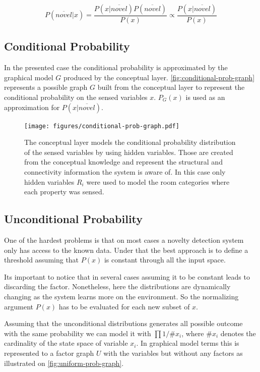 \documentclass[runningheads,a4paper]{llncs}
\begin{document}
\begin{equation}
\label{eq:novelty-threshold}
          P(\overline{novel}|x)
  =       \frac{P(x|\overline{novel}) P(\overline{novel})}{P(x)}
  \propto \frac{P(x|\overline{novel})}{P(x)}
\end{equation}

\subsection{Conditional Probability}
\label{sec:conditional-prob}


In the presented case the conditional probability is approximated by the graphical model $G$
produced by the conceptual layer.
\autoref{fig:conditional-prob-graph} represents a possible graph $G$ built from the conceptual
layer to represent the conditional probability on the sensed variables $x$.
$P_G(x)$ is used as an approximation for $P(x|\overline{novel})$.

\begin{figure}[h]
\centering
\texttt{[image: figures/conditional-prob-graph.pdf]}
\caption{\label{fig:conditional-prob-graph}The conceptual layer models the conditional
         probability distribution of the sensed variables by using hidden variables.
         Those are created from the conceptual knowledge and represent the structural
         and connectivity information the system is aware of.
         In this case only hidden variables $R_i$ were used to model the room categories
         where each property was sensed.}
\end{figure}

\subsection{Unconditional Probability}
\label{sec:unconditional-prob}
One of the hardest problems is that on most cases a novelty detection system only
has access to the known data.
Under that the best approach is to define a threshold assuming that $P(x)$ is
constant through all the input space.

Its important to notice that in several cases assuming it to be constant leads to
discarding the factor.
Nonetheless, here the distributions are dynamically changing as the system learns
more on the environment.
So the normalizing argument $P(x)$ has to be evaluated for each new subset of $x$.

Assuming that the unconditional distributions generates all possible outcome with
the same probability we can model it with $\prod{1/\# x_i}$,
where $\# x_i$ denotes the cardinality of the state space of variable $x_i$.
In graphical model terms this is represented to a factor graph $U$ with the
variables but without any factors as illustrated on \autoref{fig:uniform-prob-graph}.
\end{document}
